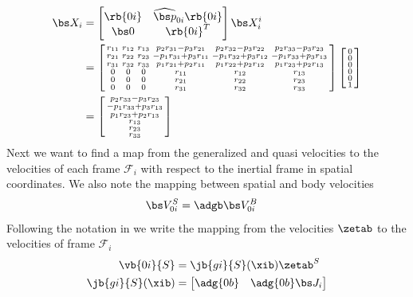 \begin{align}
	\bs X_i&=\begin{bmatrix}\rb{0i} & \widehat{\bs p}_{0i} \rb{0i} \\ \bs 0 & \rb{0i}^T \end{bmatrix}\bs X_i^i
	\label{eq:adjoint_calc}
	\\
	&= \left[\begin{smallmatrix}{}r_{11} & r_{12} & r_{13} & p_{2} r_{31} - p_{3} r_{21} & p_{2} r_{32} - p_{3} r_{22} & p_{2} r_{33} - p_{3} r_{23}\\r_{21} & r_{22} & r_{23} & - p_{1} r_{31} + p_{3} r_{11} & - p_{1} r_{32} + p_{3} r_{12} & - p_{1} r_{33} + p_{3} r_{13}\\r_{31} & r_{32} & r_{33} & p_{1} r_{21} + p_{2} r_{11} & p_{1} r_{22} + p_{2} r_{12} & p_{1} r_{23} + p_{2} r_{13}\\0 & 0 & 0 & r_{11} & r_{12} & r_{13}\\0 & 0 & 0 & r_{21} & r_{22} & r_{23}\\0 & 0 & 0 & r_{31} & r_{32} & r_{33}\end{smallmatrix}\right]
	\left[  \begin{smallmatrix}0\\0\\0\\0\\0\\1 \end{smallmatrix}  \right]
	\\
	&=\left[\begin{smallmatrix}{}p_{2} r_{33} - p_{3} r_{23}\\- p_{1} r_{33} + p_{3} r_{13}\\p_{1} r_{23} + p_{2} r_{13}\\r_{13}\\r_{23}\\r_{33}\end{smallmatrix}\right]
\end{align}
Next we want to find a map from the generalized and quasi velocities to the velocities of each frame $\mathcal{F}_i$ with respect to the inertial frame  in spatial coordinates. We also note the mapping between spatial and body velocities
\begin{align}
  \bs V_{0i}^S &=  \adgb \bs V_{0i}^B  
  \label{eq:adg0b1}
 \end{align}
Following the notation in \cite{kristin_jant} we write the mapping from the velocities $\zetab$ to the velocities of frame $\mathcal{F}_i$
\begin{align}
	\vb{0i}{S}&= \jb{gi}{S}(\xib)\zetab^S
  \label{eq:spatial_jacobi}
  \\
	\jb{gi}{S}(\xib) &= \begin{bmatrix} \adg{0b} & \adg{0b} \bs J_i\end{bmatrix}
  \label{eq:spatial_jacobi2}
\end{align}
